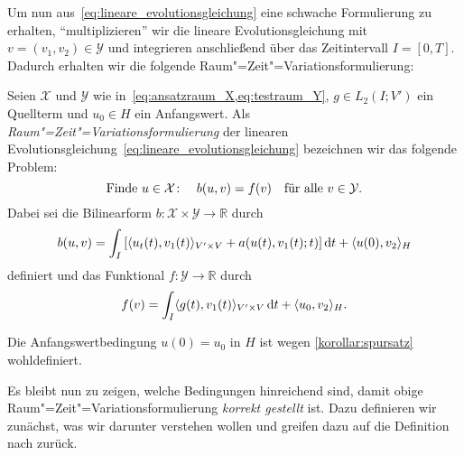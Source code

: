 Um nun aus~\cref{eq:lineare_evolutionsgleichung} eine schwache Formulierung zu erhalten, \enquote{multiplizieren} wir die lineare Evolutionsgleichung mit $v = (v_{1}, v_{2}) \in \mathcal Y$ und integrieren anschließend über das Zeitintervall $I = [0, T]$.
Dadurch erhalten wir die folgende Raum"=Zeit"=Variationsformulierung:

\begin{Definition}
\label{definition:absktrakte_raum_zeit_formulierung}
    Seien $\mathcal X$ und $\mathcal Y$ wie in~\cref{eq:ansatzraum_X,eq:testraum_Y}, $g \in L_{2}(I; V')$ ein Quellterm und $u_{0} \in H$ ein Anfangswert.
    Als \emph{Raum"=Zeit"=Variationsformulierung} der linearen Evolutionsgleichung~\cref{eq:lineare_evolutionsgleichung} bezeichnen wir das folgende Problem:
    \begin{equation}
        \label{eq:absktrakte_raum_zeit_formulierung}
        \text{Finde } u \in \mathcal X \colon \quad b(u, v) = f(v) \quad \fa v \in \mathcal Y.
    \end{equation}
    Dabei sei die Bilinearform $b \colon \mathcal X \times \mathcal Y \to \mathbb{R}$ durch
    \begin{equation}
        \label{eq:absktrakte_raum_zeit_formulierung:lhs}
        b(u, v) = \int_{I} \left[   \skp{u_{t}(t)}{v_{1}(t)}{V' \times V} + a(u(t), v_{1}(t); t)  \right] \diff t + \skp{u(0)}{v_{2}}{H}
    \end{equation}
    definiert und das Funktional $f \colon \mathcal Y \to \mathbb{R}$ durch
    \begin{equation}
        \label{eq:absktrakte_raum_zeit_formulierung:rhs}
        f(v) = \int_{I} \skp{g(t)}{v_{1}(t)}{V' \times V} \diff t + \skp{u_{0}}{v_{2}}{H}.
    \end{equation}
\end{Definition}

\begin{Bemerkung}
    Die Anfangswertbedingung $u(0) = u_{0}$ in $H$ ist wegen \cref{korollar:spursatz} wohldefiniert.
\end{Bemerkung}

Es bleibt nun zu zeigen, welche Bedingungen hinreichend sind, damit obige Raum"=Zeit"=Variationsformulierung \emph{korrekt gestellt} ist.
Dazu definieren wir zunächst, was wir darunter verstehen wollen und greifen dazu auf die Definition nach \textcite{hadamard1902problemes} zurück.

